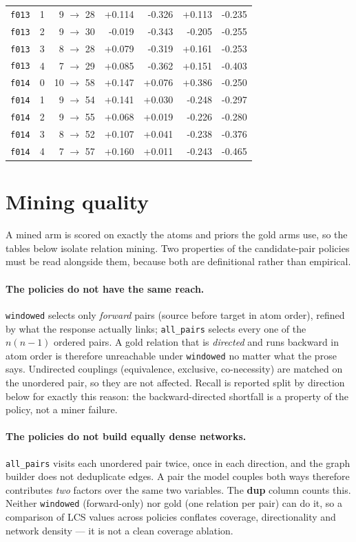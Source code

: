 \documentclass[11pt]{article}
\begin{document}
\begin{table}[htbp]
\begin{tabular}{llrrrrr}
\texttt{f013} & 1 & 9 $\to$ 28 & +0.114 & -0.326 & +0.113 & -0.235 \\
\texttt{f013} & 2 & 9 $\to$ 30 & -0.019 & -0.343 & -0.205 & -0.255 \\
\texttt{f013} & 3 & 8 $\to$ 28 & +0.079 & -0.319 & +0.161 & -0.253 \\
\texttt{f013} & 4 & 7 $\to$ 29 & +0.085 & -0.362 & +0.151 & -0.403 \\
\texttt{f014} & 0 & 10 $\to$ 58 & +0.147 & +0.076 & +0.386 & -0.250 \\
\texttt{f014} & 1 & 9 $\to$ 54 & +0.141 & +0.030 & -0.248 & -0.297 \\
\texttt{f014} & 2 & 9 $\to$ 55 & +0.068 & +0.019 & -0.226 & -0.280 \\
\texttt{f014} & 3 & 8 $\to$ 52 & +0.107 & +0.041 & -0.238 & -0.376 \\
\texttt{f014} & 4 & 7 $\to$ 57 & +0.160 & +0.011 & -0.243 & -0.465 \\
\bottomrule
\end{tabular}
\end{table}

\section{Mining quality}\label{sec:mining}

A mined arm is scored on exactly the atoms and priors the gold arms use, so the tables below isolate relation mining. Two properties of the candidate-pair policies must be read alongside them, because both are definitional rather than empirical.

\paragraph{The policies do not have the same reach.} \texttt{windowed} selects only \emph{forward} pairs (source before target in atom order), refined by what the response actually links; \texttt{all\_pairs} selects every one of the $n(n-1)$ ordered pairs. A gold relation that is \emph{directed} and runs backward in atom order is therefore unreachable under \texttt{windowed} no matter what the prose says. Undirected couplings (equivalence, exclusive, co-necessity) are matched on the unordered pair, so they are not affected. Recall is reported split by direction below for exactly this reason: the backward-directed shortfall is a property of the policy, not a miner failure.

\paragraph{The policies do not build equally dense networks.} \texttt{all\_pairs} visits each unordered pair twice, once in each direction, and the graph builder does not deduplicate edges. A pair the model couples both ways therefore contributes \emph{two} factors over the same two variables. The \textbf{dup} column counts this. Neither \texttt{windowed} (forward-only) nor gold (one relation per pair) can do it, so a comparison of LCS values across policies conflates coverage, directionality and network density --- it is not a clean coverage ablation.
\end{document}
